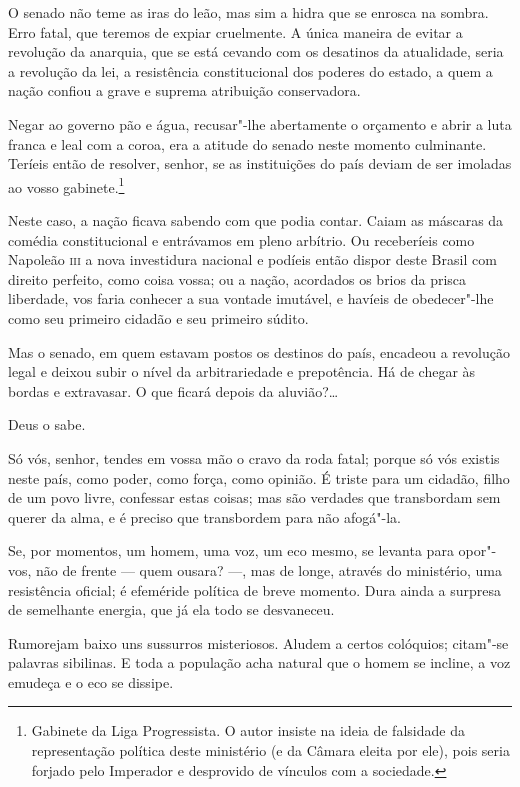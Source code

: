 \begin{linenumbers}
 O senado não teme as iras do leão, mas sim a hidra que se enrosca na
sombra. Erro fatal, que teremos de expiar cruelmente. A única maneira
de evitar a revolução da anarquia, que se está cevando com os desatinos
da atualidade, seria a revolução da lei, a resistência constitucional
dos poderes do estado, a quem a nação confiou a grave e suprema
atribuição conservadora. 

 Negar ao governo pão e água, recusar"-lhe abertamente o orçamento e
abrir a luta franca e leal com a coroa, era a atitude do senado neste
momento culminante. Teríeis então de resolver, senhor, se as
instituições do país deviam de ser imoladas ao vosso
gabinete.\footnote{ Gabinete da Liga Progressista. O autor insiste na ideia de falsidade da
representação política deste ministério (e da Câmara eleita por ele),
pois seria forjado pelo Imperador e desprovido de vínculos com a sociedade.}
 

 Neste caso, a nação ficava sabendo com que podia contar. Caiam as
máscaras da comédia constitucional e entrávamos em pleno arbítrio. Ou
receberíeis como Napoleão \textsc{iii} a nova investidura nacional e podíeis
então dispor deste Brasil com direito perfeito, como coisa vossa; ou a
nação, acordados os brios da prisca liberdade, vos faria conhecer a sua
vontade imutável, e havíeis de obedecer"-lhe como seu primeiro cidadão
e seu primeiro súdito. 

 Mas o senado, em quem estavam postos os destinos do país, encadeou a
revolução legal e deixou subir o nível da arbitrariedade e prepotência.
Há de chegar às bordas e extravasar. O que ficará depois da aluvião?\ldots{}

 Deus o sabe. 

 Só vós, senhor, tendes em vossa mão o cravo da roda fatal; porque só
vós existis neste país, como poder, como força, como opinião. É triste
para um cidadão, filho de um povo livre, confessar estas coisas; mas
são verdades que transbordam sem querer da alma, e é preciso que
transbordem para não afogá"-la. 

 Se, por momentos, um homem, uma voz, um eco mesmo, se levanta para
opor"-vos, não de frente --- quem ousara? ---, mas de longe, através do
ministério, uma resistência oficial; é efeméride política de breve
momento. Dura ainda a surpresa de semelhante energia, que já ela todo
se desvaneceu. 

 Rumorejam baixo uns sussurros misteriosos. Aludem a certos colóquios;
citam"-se palavras sibilinas. E toda a população acha natural que o
homem se incline, a voz emudeça e o eco se dissipe. 


\end{linenumbers}
